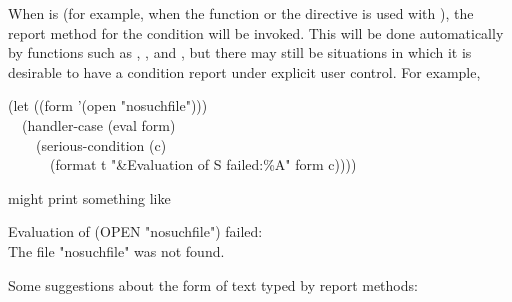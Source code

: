 When  is  (for example,
when the  function or the 
directive is used with ), the report method for the condition will be invoked. This will
be done automatically by functions such as , , and ,
but there may still be situations in which it is desirable to have a
condition report under explicit user control. For example,
\begin{lisp}
(let ((form '(open "nosuchfile"))) \\
~~(handler-case (eval form) \\
~~~~(serious-condition (c) \\
~~~~~~(format t "{\Xtilde}\&Evaluation of {\Xtilde}S failed:{\Xtilde}\%{\Xtilde}A" form c))))
\end{lisp}
might print something like
\begin{lisp}
Evaluation of (OPEN "nosuchfile") failed: \\
The file "nosuchfile" was not found.
\end{lisp}
Some suggestions about the form of text typed by report methods:
